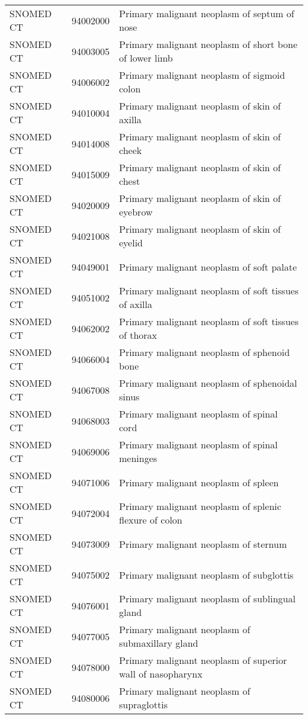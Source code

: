 \begin{longtable}{p{}p{}p{}}
  SNOMED CT & 94002000 & Primary malignant neoplasm of septum of nose \\ 
  SNOMED CT & 94003005 & Primary malignant neoplasm of short bone of lower limb \\ 
  SNOMED CT & 94006002 & Primary malignant neoplasm of sigmoid colon \\ 
  SNOMED CT & 94010004 & Primary malignant neoplasm of skin of axilla \\ 
  SNOMED CT & 94014008 & Primary malignant neoplasm of skin of cheek \\ 
  SNOMED CT & 94015009 & Primary malignant neoplasm of skin of chest \\ 
  SNOMED CT & 94020009 & Primary malignant neoplasm of skin of eyebrow \\ 
  SNOMED CT & 94021008 & Primary malignant neoplasm of skin of eyelid \\ 
  SNOMED CT & 94049001 & Primary malignant neoplasm of soft palate \\ 
  SNOMED CT & 94051002 & Primary malignant neoplasm of soft tissues of axilla \\ 
  SNOMED CT & 94062002 & Primary malignant neoplasm of soft tissues of thorax \\ 
  SNOMED CT & 94066004 & Primary malignant neoplasm of sphenoid bone \\ 
  SNOMED CT & 94067008 & Primary malignant neoplasm of sphenoidal sinus \\ 
  SNOMED CT & 94068003 & Primary malignant neoplasm of spinal cord \\ 
  SNOMED CT & 94069006 & Primary malignant neoplasm of spinal meninges \\ 
  SNOMED CT & 94071006 & Primary malignant neoplasm of spleen \\ 
  SNOMED CT & 94072004 & Primary malignant neoplasm of splenic flexure of colon \\ 
  SNOMED CT & 94073009 & Primary malignant neoplasm of sternum \\ 
  SNOMED CT & 94075002 & Primary malignant neoplasm of subglottis \\ 
  SNOMED CT & 94076001 & Primary malignant neoplasm of sublingual gland \\ 
  SNOMED CT & 94077005 & Primary malignant neoplasm of submaxillary gland \\ 
  SNOMED CT & 94078000 & Primary malignant neoplasm of superior wall of nasopharynx \\ 
  SNOMED CT & 94080006 & Primary malignant neoplasm of supraglottis \\ 

\end{longtable}
